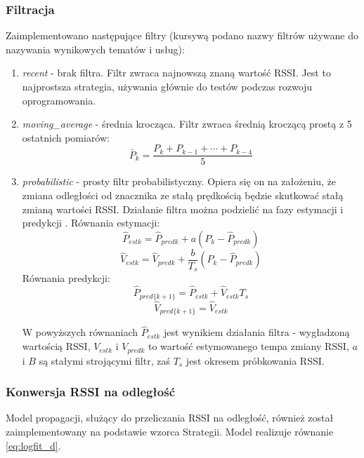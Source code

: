 \subsubsection{Filtracja}
Zaimplementowano następujące filtry (kursywą podano nazwy filtrów używane do nazywania wynikowych tematów i usług):
\begin{enumerate}
 \item \textit{recent} - brak filtra. Filtr zwraca najnowszą znaną wartość RSSI. Jest to najprostsza strategia, używania głównie do testów podczas rozwoju oprogramowania.
 \item \textit{moving{\_}average} - średnia krocząca. Filtr zwraca średnią kroczącą prostą z 5 ostatnich pomiarów:
      \begin{equation}
       \bar P_{k} = \frac{ P_{k} + P_{k-1} + \cdots + P_{k-4} }{5}
      \end{equation}
 \item \textit{probabilistic} - prosty filtr probabilistyczny. Opiera się on na założeniu, że zmiana odległości od znacznika ze stałą prędkością będzie skutkować stałą zmianą wartości RSSI. Działanie filtra można podzielić na fazy estymacji i predykcji \cite{trilat_iter}. Równania estymacji:
 \begin{equation}
  \hat P_{est k } = \hat P_{pred k } + a (P_{k } - \hat P_{pred k })
 \end{equation}
 \begin{equation}
  \hat V_{est k } = \hat V_{pred k } + \frac{b}{T_s} (P_{k } - \hat P_{pred k })
 \end{equation}
 Równania predykcji:
 \begin{equation}
  \hat P_{pred \{k+1\} } = \hat P_{est k } + \hat V_{est k } T_s
 \end{equation}
 \begin{equation}
  \hat V_{pred \{k+1\} } = \hat V_{est k }
 \end{equation}
 
  W powyższych równaniach $\hat P_{est k }$ jest wynikiem działania filtra - wygładzoną wartością RSSI, $V_{est k }$ i $V_{pred k }$ to wartość estymowanego tempa zmiany RSSI, $a$ i $B$ są stałymi strojącymi filtr, zaś $T_s$ jest okresem próbkowania RSSI. 

\end{enumerate}

\subsubsection{Konwersja RSSI na odległość}
Model propagacji, służący do przeliczania RSSI na odległość, również został zaimplementowany na podstawie wzorca Strategii. Model realizuje równanie \ref{eq:logfit_d}.

